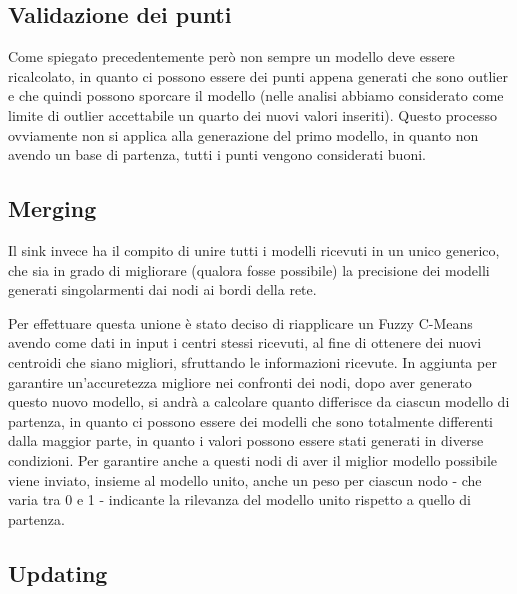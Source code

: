 
\subsection{Validazione dei punti}
Come spiegato precedentemente però non sempre un modello deve essere ricalcolato, in quanto ci possono essere dei punti appena generati che sono outlier e che quindi possono sporcare il modello (nelle analisi abbiamo considerato come limite di outlier accettabile un quarto dei nuovi valori inseriti).
Questo processo ovviamente non si applica alla generazione del primo modello, in quanto non avendo un base di partenza, tutti i punti vengono considerati buoni.



\subsection{Merging}

Il sink invece ha il compito di unire tutti i modelli ricevuti in un unico generico, che sia in grado di migliorare (qualora fosse possibile) la precisione dei modelli generati singolarmenti dai nodi ai bordi della rete.

Per effettuare questa unione è stato deciso di riapplicare un Fuzzy C-Means avendo come dati in input i centri stessi ricevuti, al fine di ottenere dei nuovi centroidi che siano migliori, sfruttando le informazioni ricevute. In aggiunta per garantire un'accuretezza migliore nei confronti dei nodi, dopo aver generato questo nuovo modello, si andrà a calcolare quanto differisce da ciascun modello di partenza, in quanto ci possono essere dei modelli che sono totalmente differenti dalla maggior parte, in quanto i valori possono essere stati generati in diverse condizioni. Per garantire anche a questi nodi di aver il miglior modello possibile viene inviato, insieme al modello unito, anche un peso per ciascun nodo - che varia tra 0 e 1 - indicante la rilevanza del modello unito rispetto a quello di partenza.



\subsection{Updating}

